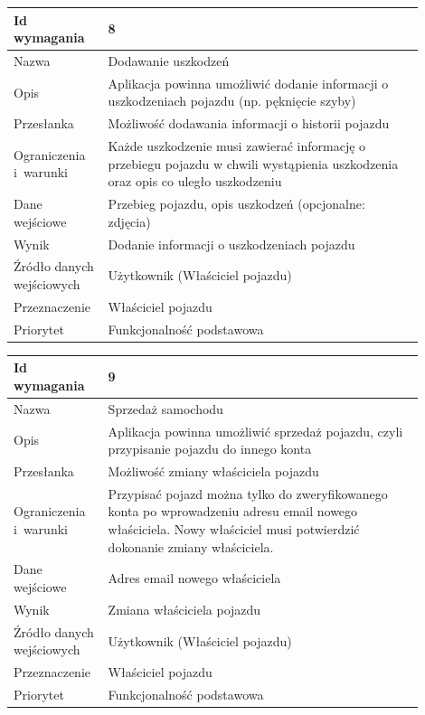 \documentclass[12pt]{article}
\begin{document}
\begin{table}[H]
\begin{center}
	\begin{tabular}{|p{0.18\linewidth}|p{0.72\linewidth}|}%
	\hline
	Id wymagania 	& 8 				\\ \hline
	Nazwa			& Dodawanie uszkodzeń \\ \hline
	Opis &Aplikacja powinna umożliwić dodanie informacji o uszkodzeniach pojazdu (np. pęknięcie szyby)\\ \hline
	Przesłanka & Możliwość dodawania informacji o historii pojazdu  \\ \hline
	Ograniczenia i~warunki & Każde uszkodzenie musi zawierać informację o przebiegu pojazdu w chwili wystąpienia uszkodzenia oraz opis co uległo uszkodzeniu \\ \hline
	Dane wejściowe &Przebieg pojazdu, opis uszkodzeń
(opcjonalne: zdjęcia)\\ \hline
	Wynik & Dodanie informacji o uszkodzeniach pojazdu\\ \hline
	Źródło danych wejściowych &Użytkownik (Właściciel pojazdu)\\ \hline
Przeznaczenie & Właściciel pojazdu\\ \hline
Priorytet & Funkcjonalność podstawowa \\ \hline
	\end{tabular}
\end{center}
\end{table}


\begin{table}[H]
\begin{center}
	\begin{tabular}{|p{0.18\linewidth}|p{0.72\linewidth}|}%
	\hline
	Id wymagania 	& 9 				\\ \hline
	Nazwa			& Sprzedaż samochodu \\ \hline
	Opis &Aplikacja powinna umożliwić sprzedaż pojazdu, czyli przypisanie pojazdu do innego konta
\\ \hline
	Przesłanka & Możliwość zmiany właściciela pojazdu  \\ \hline
	Ograniczenia i~warunki & Przypisać pojazd można tylko do zweryfikowanego konta po wprowadzeniu adresu email nowego właściciela. Nowy właściciel musi potwierdzić dokonanie zmiany właściciela. \\ \hline
	Dane wejściowe &Adres email nowego właściciela \\ \hline
	Wynik & Zmiana właściciela pojazdu\\ \hline
	Źródło danych wejściowych &Użytkownik (Właściciel pojazdu)\\ \hline
	Przeznaczenie & Właściciel pojazdu\\ \hline
	Priorytet & Funkcjonalność podstawowa \\ \hline
	\end{tabular}
\end{center}
\end{table}
\end{document}
